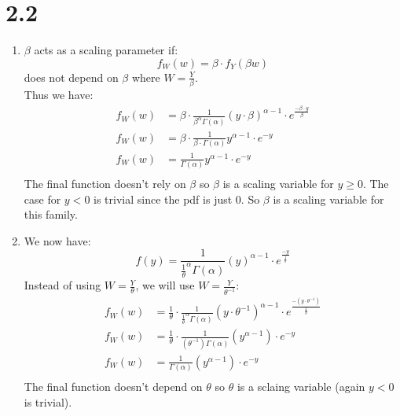 \documentclass{article}
\begin{document}
\section*{2.2}
\begin{enumerate}
\item $\beta$ acts as a scaling parameter if: \\
\[
f_W(w) = \beta \cdot f_Y(\beta w)
\]
does not depend on $\beta$ where $W = \frac{Y}{\beta}$. \\
Thus we have: \\
\begin{align*}
f_W(w) &= \beta \cdot \frac{1}{\beta^{\alpha}\Gamma(\alpha)}(y \cdot \beta)^{\alpha - 1} \cdot e^{\frac{-\beta \cdot y}{\beta}} \\
f_W(w) &= \beta \cdot \frac{1}{\beta \cdot \Gamma(\alpha)}y^{\alpha - 1}\cdot e^{-y} \\
f_W(w) &= \frac{1}{\Gamma(\alpha)}y^{\alpha - 1}\cdot e^{-y} \\
\end{align*}
The final function doesn't rely on $\beta$ so $\beta$ is a scaling variable for $y \geq 0$. The case for $y < 0$ is trivial since the pdf is just 0. So $\beta$ is a scaling variable for this family. \\
\item We now have: \\
\[
f(y) = \frac{1}{\frac{1}{\theta}^{\alpha}\Gamma(\alpha)}(y)^{\alpha - 1} \cdot e^{\frac{-y}{\frac{1}{\theta}}} 
\]
Instead of using $W = \frac{Y}{\theta}$, we will use $W = \frac{Y}{\theta^{-1}}$: \\
\begin{align*}
f_W(w) &= \frac{1}{\theta} \cdot \frac{1}{\frac{1}{\theta}^{\alpha}\Gamma(\alpha)}(y \cdot \theta^{-1})^{\alpha - 1} \cdot e^{\frac{-(y \cdot \theta^{-1})}{\frac{1}{\theta}}} \\
f_W(w) &= \frac{1}{\theta} \cdot \frac{1}{(\theta^{-1})\Gamma(\alpha)}(y^{\alpha - 1}) \cdot e^{-y} \\
f_W(w) &= \frac{1}{\Gamma(\alpha)}(y^{\alpha - 1}) \cdot e^{-y} \\
\end{align*}
The final function doesn't depend on $\theta$ so $\theta$ is a sclaing variable (again $y < 0$ is trivial). 
\end{enumerate}
\end{document}
